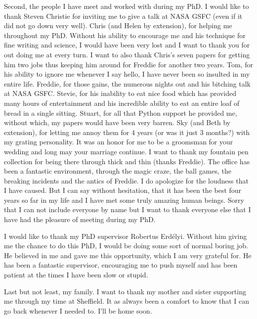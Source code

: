 \begin{acknowledgements}
    Second, the people I have meet and worked with during my PhD.
    I would like to thank Steven Christie for inviting me to give a talk at NASA GSFC (even if it did not go down very well).
    Chris (and Helen by extension), for helping me throughout my PhD.
    Without his ability to encourage me and his technique for fine writing and science, I would have been very lost and I want to thank you for out doing me at every turn.
    I want to also thank Chris's seven papers for getting him two jobs thus keeping him around for Freddie for another two years.
    Tom, for his ability to ignore me whenever I say hello, I have never been so insulted in my entire life.
    Freddie, for those gains, the numerous nights out and his bitching talk at NASA GSFC.
    Stevie, for his inability to eat nice food which has provided many hours of entertainment and his incredible ability to eat an entire loaf of bread in a single sitting. 
    Stuart, for all that Python support he provided me, without which, my papers would have been very barren.
    Sky (and Beth by extension), for letting me annoy them for 4 years (or was it just 3 months?) with my grating personality.
    It was an honor for me to be a groomsman for your wedding and long may your marriage continue.
    I want to thank my fountain pen collection for being there through thick and thin (thanks Freddie).
    The office has been a fantastic environment, through the magic craze, the ball games, the breaking incidents and the antics of Freddie. 
    I do apologize for the loudness that I have caused.
    But I can say without hesitation, that it has been the best four years so far in my life and I have met some truly amazing human beings.
    Sorry that I can not include everyone by name but I want to thank everyone else that I have had the pleasure of meeting during my PhD.
        
    I would like to thank my PhD supervisor Robertus Erd\'elyi.
    Without him giving me the chance to do this PhD, I would be doing some sort of normal boring job.
    He believed in me and gave me this opportunity, which I am very grateful for.
    He has been a fantastic supervisor, encouraging me to push myself and has been patient at the times I have been slow or stupid.
    
    Last but not least, my family.
    I want to thank my mother and sister supporting me through my time at Sheffield.
    It as always been a comfort to know that I can go back whenever I needed to.
    I'll be home soon.
    
\end{acknowledgements}